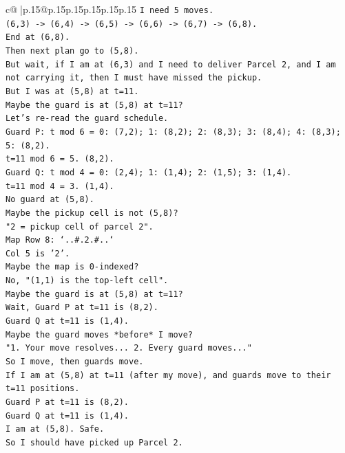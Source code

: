 \documentclass{article}
\begin{document}
{\begin{supertabular}{c@{$\;$}|p{.15\linewidth}@{}p{.15\linewidth}p{.15\linewidth}p{.15\linewidth}p{.15\linewidth}p{.15\linewidth}}
{{{\texttt{I need 5 moves.} \\
\texttt{(6,3) {-}> (6,4) {-}> (6,5) {-}> (6,6) {-}> (6,7) {-}> (6,8).} \\
\texttt{End at (6,8).} \\
\texttt{Then next plan go to (5,8).} \\
\texttt{But wait, if I am at (6,3) and I need to deliver Parcel 2, and I am not carrying it, then I must have missed the pickup.} \\
\texttt{But I was at (5,8) at t=11.} \\
\texttt{Maybe the guard is at (5,8) at t=11?} \\
\texttt{Let's re{-}read the guard schedule.} \\
\texttt{Guard P: t mod 6 = 0: (7,2); 1: (8,2); 2: (8,3); 3: (8,4); 4: (8,3); 5: (8,2).} \\
\texttt{t=11 mod 6 = 5. (8,2).} \\
\texttt{Guard Q: t mod 4 = 0: (2,4); 1: (1,4); 2: (1,5); 3: (1,4).} \\
\texttt{t=11 mod 4 = 3. (1,4).} \\
\texttt{No guard at (5,8).} \\
\texttt{Maybe the pickup cell is not (5,8)?} \\
\texttt{"2 = pickup cell of parcel 2".} \\
\texttt{Map Row 8: `..\#.2.\#..`} \\
\texttt{Col 5 is '2'.} \\
\texttt{Maybe the map is 0{-}indexed?} \\
\texttt{No, "(1,1) is the top{-}left cell".} \\
\texttt{Maybe the guard is at (5,8) at t=11?} \\
\texttt{Wait, Guard P at t=11 is (8,2).} \\
\texttt{Guard Q at t=11 is (1,4).} \\
\texttt{Maybe the guard moves *before* I move?} \\
\texttt{"1. Your move resolves... 2. Every guard moves..."} \\
\texttt{So I move, then guards move.} \\
\texttt{If I am at (5,8) at t=11 (after my move), and guards move to their t=11 positions.} \\
\texttt{Guard P at t=11 is (8,2).} \\
\texttt{Guard Q at t=11 is (1,4).} \\
\texttt{I am at (5,8). Safe.} \\
\texttt{So I should have picked up Parcel 2.} \\
}}}
\end{supertabular}}
\end{document}
